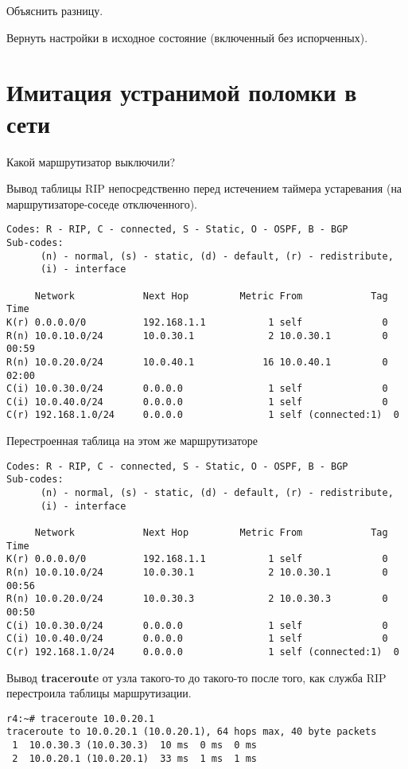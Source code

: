 \documentclass[a4paper,12pt]{article}
\begin{document}
Объяснить разницу.

Вернуть настройки в исходное состояние (включенный без испорченных).


\section{Имитация устранимой поломки в сети}

Какой маршрутизатор выключили?

Вывод таблицы RIP непосредственно перед истечением таймера устаревания (на маршрутизаторе-соседе отключенного).

\begin{Verbatim}
Codes: R - RIP, C - connected, S - Static, O - OSPF, B - BGP
Sub-codes:
      (n) - normal, (s) - static, (d) - default, (r) - redistribute,
      (i) - interface

     Network            Next Hop         Metric From            Tag Time
K(r) 0.0.0.0/0          192.168.1.1           1 self              0
R(n) 10.0.10.0/24       10.0.30.1             2 10.0.30.1         0 00:59
R(n) 10.0.20.0/24       10.0.40.1            16 10.0.40.1         0 02:00
C(i) 10.0.30.0/24       0.0.0.0               1 self              0
C(i) 10.0.40.0/24       0.0.0.0               1 self              0
C(r) 192.168.1.0/24     0.0.0.0               1 self (connected:1)  0
\end{Verbatim}

Перестроенная таблица на этом же маршрутизаторе

\begin{Verbatim}
Codes: R - RIP, C - connected, S - Static, O - OSPF, B - BGP
Sub-codes:
      (n) - normal, (s) - static, (d) - default, (r) - redistribute,
      (i) - interface

     Network            Next Hop         Metric From            Tag Time
K(r) 0.0.0.0/0          192.168.1.1           1 self              0
R(n) 10.0.10.0/24       10.0.30.1             2 10.0.30.1         0 00:56
R(n) 10.0.20.0/24       10.0.30.3             2 10.0.30.3         0 00:50
C(i) 10.0.30.0/24       0.0.0.0               1 self              0
C(i) 10.0.40.0/24       0.0.0.0               1 self              0
C(r) 192.168.1.0/24     0.0.0.0               1 self (connected:1)  0
\end{Verbatim}


Вывод \textbf{traceroute} от узла такого-то до такого-то после того, как служба RIP перестроила таблицы маршрутизации.

\begin{Verbatim}
r4:~# traceroute 10.0.20.1
traceroute to 10.0.20.1 (10.0.20.1), 64 hops max, 40 byte packets
 1  10.0.30.3 (10.0.30.3)  10 ms  0 ms  0 ms
 2  10.0.20.1 (10.0.20.1)  33 ms  1 ms  1 ms
\end{Verbatim}
\end{document}
